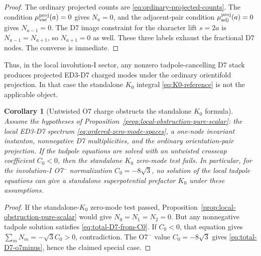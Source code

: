 \documentclass[11pt]{article}
\newcommand{\vac}{\mathrm{vac}}
\newtheorem{corollary}{Corollary}
\begin{document}
\begin{proof}
The ordinary projected counts are \eqref{eq:ordinary-projected-counts}. The condition
$\mu_{\vac}^{\rm proj}(a)=0$ gives $N_a=0$, and the adjacent-pair condition
$\mu_{\rm adj}^{\rm proj}(a)=0$ gives $N_{a-1}=0$. The D7 image constraint for the character
lift $s=2a$ is $N_{a-1}=N_{a+1}$, so $N_{a+1}=0$ as well. These three labels exhaust the
fractional D7 nodes. The converse is immediate.
\end{proof}

Thus, in the local involution-I sector, any nonzero tadpole-cancelling D7 stack produces
projected ED3-D7 charged modes under the ordinary orientifold projection. In that case the
standalone \(K_0\) integral \eqref{eq:K0-reference} is not the applicable object.

\begin{corollary}[Untwisted O7 charge obstructs the standalone \(K_0\) formula]
\label{cor:pureK0-obstructed-by-untwisted-charge}
Assume the hypotheses of Proposition~\ref{prop:local-obstruction-pure-scalar}: the local
ED3-D7 spectrum \eqref{eq:ordered-zero-mode-spaces}, a one-node invariant instanton, nonnegative
D7 multiplicities, and the ordinary orientation-pair projection. If the tadpole equations are
solved with an untwisted crosscap coefficient $C_0<0$, then the standalone \(K_0\) zero-mode
test fails. In particular, for the involution-I O7$^-$ normalization
$C_0=-8\sqrt{3}$, no solution of the local tadpole equations can give a standalone
superpotential prefactor \(K_0\) under these assumptions.
\end{corollary}

\begin{proof}
If the standalone-\(K_0\) zero-mode test passed, Proposition~\ref{prop:local-obstruction-pure-scalar}
would give $N_0=N_1=N_2=0$. But any nonnegative tadpole solution satisfies
\eqref{eq:total-D7-from-C0}. If $C_0<0$, that equation gives
$\sum_m N_m=-\sqrt{3}C_0>0$, contradiction. The O7$^-$ value
$C_0=-8\sqrt{3}$ gives \eqref{eq:total-D7-o7minus}, hence the claimed special case.
\end{proof}
\end{document}
